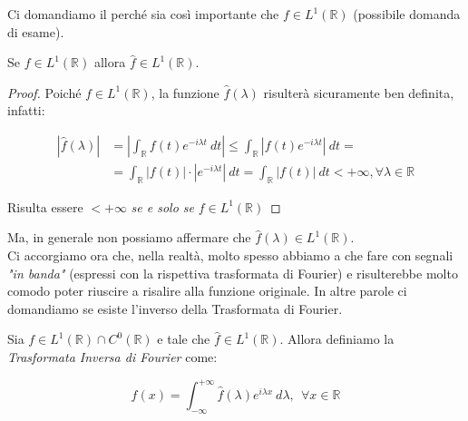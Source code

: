 \vspace{1cm}

Ci domandiamo il perché sia così importante che $f \in L^1(\mathbb{R})$
(possibile domanda di esame).\\

\begin{center}
    Se $f \in L^1(\mathbb{R})$ allora $\hat{f} \in L^1(\mathbb{R})$.
\end{center}

\begin{proof}
    Poiché $f \in L^1(\mathbb{R})$, la funzione $\hat{f}(\lambda)$ risulterà
    sicuramente ben definita, infatti:

    \begin{equation}
        \begin{aligned}
            |\hat{f}(\lambda)| & = \left|\int_{\mathbb{R}} f(t) e^{-i \lambda t} \ dt \right| \leq \int_{\mathbb{R}} |f(t) e^{-i \lambda t}| \ dt =                  \\
                               & = \int_{\mathbb{R}} |f(t)| \cdot |e^{-i \lambda t}| \ dt = \int_{\mathbb{R}} |f(t)| \ dt < + \infty, \forall \lambda \in \mathbb{R}
        \end{aligned}
    \end{equation}

    Risulta essere $< +\infty$ \textit{se e solo se} $f\in L^1(\mathbb{R})$

\end{proof}

Ma, in generale non possiamo affermare che $\hat{f}(\lambda)
    \in L^1(\mathbb{R})$.\\


Ci accorgiamo ora che, nella realtà, molto spesso abbiamo a che fare con segnali
\textit{"in banda"} (espressi con la rispettiva trasformata di Fourier) e
risulterebbe molto comodo poter riuscire a risalire alla funzione originale. In
altre parole ci domandiamo se esiste l'inverso della Trasformata di Fourier.

\begin{theorem}
    Sia $f \in L^1(\mathbb{R}) \cap C^0(\mathbb{R})$ e tale che $\hat{f} \in
        L^1(\mathbb{R})$. Allora definiamo la \textit{Trasformata Inversa di
        Fourier} come:

    $$
        f(x) = \int_{-\infty}^{+\infty} \hat{f}(\lambda) e^{i \lambda x} \
        d\lambda, \ \ \forall x \in \mathbb{R}
    $$
\end{theorem}

